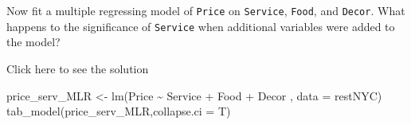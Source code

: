 \documentclass[
  letterpaper,
  DIV=11,
  numbers=noendperiod]{scrartcl}
\newenvironment{Shaded}{\begin{snugshade}}{\end{snugshade}}
\newcommand{\AttributeTok}[1]{\textcolor[rgb]{0.40,0.45,0.13}{#1}}
\newcommand{\FunctionTok}[1]{\textcolor[rgb]{0.28,0.35,0.67}{#1}}
\newcommand{\NormalTok}[1]{\textcolor[rgb]{0.00,0.23,0.31}{#1}}
\newcommand{\OtherTok}[1]{\textcolor[rgb]{0.00,0.23,0.31}{#1}}
\newcommand{\SpecialCharTok}[1]{\textcolor[rgb]{0.37,0.37,0.37}{#1}}
\begin{document}
\begin{tcolorbox}[enhanced jigsaw, toprule=.15mm, breakable, bottomtitle=1mm, coltitle=black, colback=white, arc=.35mm, left=2mm, leftrule=.75mm, opacitybacktitle=0.6, colframe=quarto-callout-warning-color-frame, colbacktitle=quarto-callout-warning-color!10!white, toptitle=1mm, titlerule=0mm, opacityback=0, title={Task 8}, rightrule=.15mm, bottomrule=.15mm]

Now fit a multiple regressing model of \texttt{Price} on
\texttt{Service}, \texttt{Food}, and \texttt{Decor}. What happens to the
significance of \texttt{Service} when additional variables were added to
the model?

Click here to see the solution

\begin{Shaded}
\begin{Highlighting}[]
\NormalTok{price\_serv\_MLR }\OtherTok{\textless{}{-}} \FunctionTok{lm}\NormalTok{(Price  }\SpecialCharTok{\textasciitilde{}}\NormalTok{ Service }\SpecialCharTok{+}\NormalTok{ Food }\SpecialCharTok{+}\NormalTok{ Decor , }\AttributeTok{data =}\NormalTok{ restNYC)}
\FunctionTok{tab\_model}\NormalTok{(price\_serv\_MLR,}\AttributeTok{collapse.ci =}\NormalTok{ T)}
\end{Highlighting}
\end{Shaded}


\end{tcolorbox}
\end{document}
